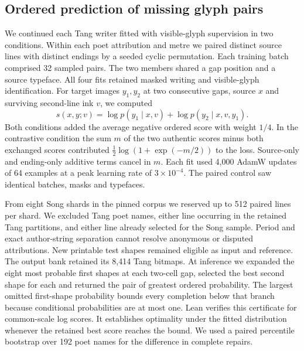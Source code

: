 \subsection*{Ordered prediction of missing glyph pairs}
We continued each Tang writer fitted with visible-glyph supervision in two conditions. Within each poet attribution and metre we paired distinct source lines with distinct endings by a seeded cyclic permutation. Each training batch comprised 32 sampled pairs. The two members shared a gap position and a source typeface. All four fits retained masked writing and visible-glyph identification. For target images $y_1,y_2$ at two consecutive gaps, source $x$ and surviving second-line ink $v$, we computed
\[
 s(x,y;v)=\log p(y_1\mid x,v)+\log p(y_2\mid x,v,y_1).
\]
Both conditions added the average negative ordered score with weight $1/4$. In the contrastive condition the sum $m$ of the two authentic scores minus both exchanged scores contributed $\frac12\log(1+\exp(-m/2))$ to the loss. Source-only and ending-only additive terms cancel in $m$. Each fit used 4,000 AdamW updates of 64 examples at a peak learning rate of $3\times10^{-4}$. The paired control saw identical batches, masks and typefaces.

From eight Song shards in the pinned corpus we reserved up to 512 paired lines per shard. We excluded Tang poet names, either line occurring in the retained Tang partitions, and either line already selected for the Song sample. Period and exact author-string separation cannot resolve anonymous or disputed attributions. New printable test shapes remained eligible as input and reference. The output bank retained its 8,414 Tang bitmaps. At inference we expanded the eight most probable first shapes at each two-cell gap, selected the best second shape for each and returned the pair of greatest ordered probability. The largest omitted first-shape probability bounds every completion below that branch because conditional probabilities are at most one. Lean verifies this certificate for common-scale log scores. It establishes optimality under the fitted distribution whenever the retained best score reaches the bound. We used a paired percentile bootstrap over 192 poet names for the difference in complete repairs.
